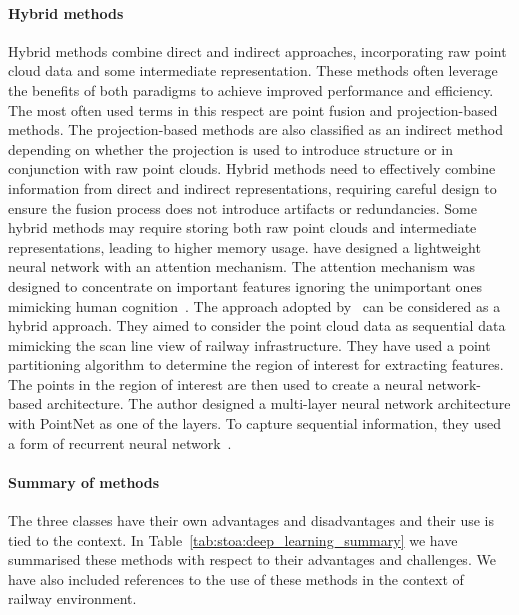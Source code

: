 \paragraph{Hybrid methods}
Hybrid methods combine direct and indirect approaches, incorporating raw point cloud data and some intermediate representation. These methods often leverage the benefits of both paradigms to achieve improved performance and efficiency. The most often used terms in this respect are point fusion and projection-based methods. The projection-based methods are also classified as an indirect method depending on whether the projection is used to introduce structure or in conjunction with raw point clouds. Hybrid methods need to effectively combine information from direct and indirect representations, requiring careful design to ensure the fusion process does not introduce artifacts or redundancies. Some hybrid methods may require storing both raw point clouds and intermediate representations, leading to higher memory usage.
\citeauthor{liu2021an} have designed a lightweight neural network with an attention mechanism. The attention mechanism was designed to concentrate on important features ignoring the unimportant ones mimicking human cognition~\cite{liu2021an}. 
The approach adopted by~\citeauthor{chen2020deep} can be considered as a hybrid approach. They aimed to consider the point cloud data as sequential data mimicking the scan line view of railway infrastructure. They have used a point partitioning algorithm to determine the region of interest for extracting features. The points in the region of interest are then used to create a neural network-based architecture. The author designed a multi-layer neural network architecture with PointNet as one of the layers. To capture sequential information, they used a form of recurrent neural network~\cite{chen2020deep}.

\paragraph{Summary of methods}
The three classes have their own advantages and disadvantages and their use is tied to the context. In Table~\ref{tab:stoa:deep_learning_summary} we have summarised these methods with respect to their advantages and challenges. We have also included references to the use of these methods in the context of railway environment. 

